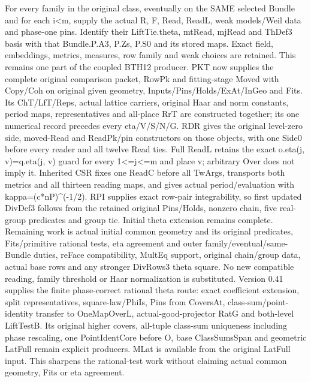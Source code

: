 \documentclass[11pt,a4paper]{article}
\numberwithin{equation}{section}
\theoremstyle{remark}\newtheorem{remark}[theorem]{Remark}
\begin{document}
For every family in the original class, eventually on the SAME selected Bundle and for each i<m, supply the actual R,\allowbreak{} F,\allowbreak{} Read,\allowbreak{} ReadL, weak models/\allowbreak{}Weil data and phase-one pins. Identify their LiftTie.theta, mtRead, mjRead and ThDef3 basis with that Bundle.P.A3, P.Zs, P.S0 and its stored maps. Exact field, embeddings, metrics, measures, row family and weak choices are retained. This remains one part of the coupled BTH12 producer. PKT now supplies the complete original comparison packet, RowPk and fitting-stage Moved with Copy/\allowbreak{}Coh on original given geometry, Inputs/\allowbreak{}Pins/\allowbreak{}Holds/\allowbreak{}ExAt/\allowbreak{}InGeo and Fits. Its ChT/\allowbreak{}LfT/\allowbreak{}Reps, actual lattice carriers, original Haar and norm constants, period maps, representatives and all-place RrT are constructed together; its one numerical record precedes every eta/\allowbreak{}V/\allowbreak{}S/\allowbreak{}N/\allowbreak{}G. RDR gives the original level-zero side, moved-Read and ReadPk/\allowbreak{}pin constructors on those objects, with one Side0 before every reader and all twelve Read ties. Full ReadL retains the exact o.eta(j,\allowbreak{} v)=q.eta(j,\allowbreak{} v) guard for every 1<=j<=m and place v; arbitrary Over does not imply it. Inherited CSR fixes one ReadC before all TwArgs, transports both metrics and all thirteen reading maps, and gives actual period/\allowbreak{}evaluation with kappa=(c*nP)\textasciicircum{}(-1/\allowbreak{}2). RPI supplies exact row-pair integrability, so first updated DivDef3 follows from the retained original Pins/\allowbreak{}Holds, nonzero chain, five real-group predicates and group tie. Initial theta extension remains complete. Remaining work is actual initial common geometry and its original predicates, Fits/\allowbreak{}primitive rational tests, eta agreement and outer family/\allowbreak{}eventual/\allowbreak{}same-Bundle duties, reFace compatibility, MultEq support, original chain/\allowbreak{}group data, actual base rows and any stronger DivRows3 theta square. No new compatible reading, family threshold or Haar normalization is substituted. Version 0.41 supplies the finite phase-correct rational theta route: exact coefficient extension, split representatives, square-law/\allowbreak{}PhiIs, Pins from CoversAt, class-sum/\allowbreak{}point-identity transfer to OneMapOverL, actual-good-projector RatG and both-level LiftTestB. Its original higher covers, all-tuple class-sum uniqueness including phase rescaling, one PointIdentCore before O, base ClassSumsSpan and geometric LatFull remain explicit producers. MLat is available from the original LatFull input. This sharpens the rational-test work without claiming actual common geometry, Fits or eta agreement.
\end{document}

